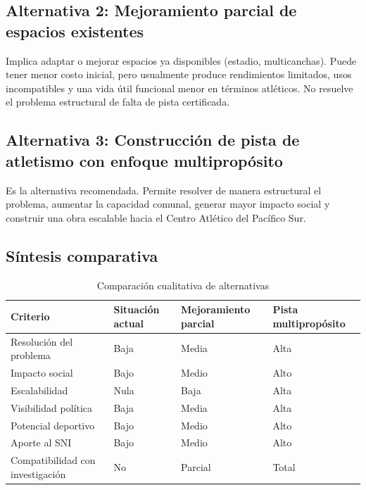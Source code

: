 \documentclass[12pt, a4paper]{article}
\begin{document}
\subsection{Alternativa 2: Mejoramiento parcial de espacios existentes}

Implica adaptar o mejorar espacios ya disponibles (estadio, multicanchas).
Puede tener menor costo inicial, pero usualmente produce rendimientos limitados,
usos incompatibles y una vida útil funcional menor en términos atléticos. No
resuelve el problema estructural de falta de pista certificada.

\subsection{Alternativa 3: Construcción de pista de atletismo con enfoque multipropósito}

Es la alternativa recomendada. Permite resolver de manera estructural el problema,
aumentar la capacidad comunal, generar mayor impacto social y construir una obra
escalable hacia el Centro Atlético del Pacífico Sur.

\subsection{Síntesis comparativa}

\begin{table}[h!]
\centering
\caption{Comparación cualitativa de alternativas}
\begin{tabularx}{\linewidth}{
  >{\RaggedRight\arraybackslash}p{3.5cm}
  >{\centering\arraybackslash}X
  >{\centering\arraybackslash}X
  >{\centering\arraybackslash}X}
\toprule
\textbf{Criterio} & \textbf{Situación actual} & \textbf{Mejoramiento parcial} & \textbf{Pista multipropósito} \\
\midrule
Resolución del problema & Baja & Media & Alta \\
Impacto social & Bajo & Medio & Alto \\
Escalabilidad & Nula & Baja & Alta \\
Visibilidad política & Baja & Media & Alta \\
Potencial deportivo & Bajo & Medio & Alto \\
Aporte al SNI & Bajo & Medio & Alto \\
Compatibilidad con investigación & No & Parcial & Total \\
\bottomrule
\end{tabularx}
\end{table}
\end{document}
